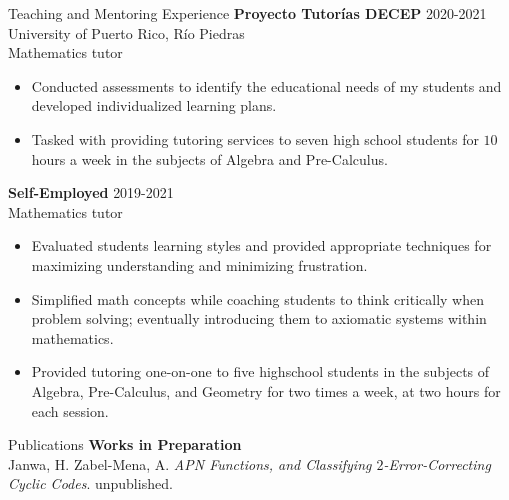 \documentclass{resume} %
\begin{document}
\begin{rSection}{Teaching and Mentoring Experience}
    \textbf{Proyecto Tutor\'ias DECEP} \hfill{2020-2021} \\
    University of Puerto Rico, R\'io Piedras \\
    Mathematics tutor
    \begin{itemize}
        \item Conducted assessments to identify the educational needs of my
            students and developed individualized learning plans.

        \item Tasked with providing tutoring services to seven high school
            students for $10$ hours a week in the subjects of Algebra and
            Pre-Calculus.
    \end{itemize}

    \textbf{Self-Employed} \hfill{2019-2021} \\
    Mathematics tutor

    \begin{itemize}
        \item Evaluated students learning styles and provided appropriate
            techniques for maximizing understanding and minimizing frustration.

        \item Simplified math concepts while coaching students to think
            critically when problem solving; eventually introducing them to
            axiomatic systems within mathematics.

        \item Provided tutoring one-on-one to five highschool students in the
            subjects of Algebra, Pre-Calculus, and Geometry for two times a
            week, at two hours for each session.
    \end{itemize}
\end{rSection}

\begin{rSection}{Publications}
    \textbf{Works in Preparation} \\
    \hspace*{10mm} Janwa, H. Zabel-Mena, A. \textit{APN Functions, and Classifying
    $2$-Error-Correcting Cyclic Codes}.
    \hspace*{10mm} unpublished.


\end{rSection}
\end{document}
